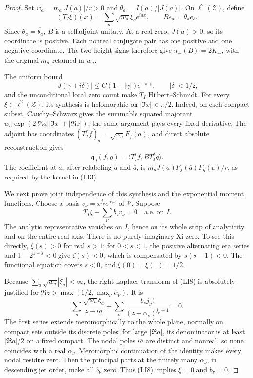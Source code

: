 \documentclass[11pt]{article}
\theoremstyle{remark}\newtheorem{remark}[theorem]{Remark}
\begin{document}
\begin{proof}
Set \(w_a=m_a|J(a)|/r>0\) and \(\theta_a=J(a)/|J(a)|\).
On \(\ell^2(\mathcal Z)\), define
\[
 (T_I\xi)(x)=\sum_a\sqrt{w_a}\xi_a e^{i\overline a x},
 \qquad B e_a=\theta_a e_{\overline a}.
 \tag{LI5}
\]
Since \(\theta_{\overline a}=\overline{\theta_a}\), \(B\) is a
selfadjoint unitary. At a real zero, \(J(a)>0\), so its coordinate
is positive. Each nonreal conjugate pair has one positive and one
negative coordinate. The two height signs therefore give
\(n_-(B)=2K_+\), with the original \(m_a\) retained in \(w_a\).

The uniform bound
\[
 |J(\gamma+i\delta)|\le C(1+|\gamma|)e^{-\pi|\gamma|},
 \qquad |\delta|<1/2,
 \tag{LI6}
\]
and the unconditional local zero count make \(T_I\)
Hilbert--Schmidt. For every \(\xi\in\ell^2(\mathcal Z)\), its
synthesis is holomorphic on \(|\Im x|<\pi/2\). Indeed, on each
compact subset, Cauchy--Schwarz gives the summable squared
majorant \(w_a\exp(2|\Re a||\Im x|+|\Re x|)\); the same argument
pays every fixed derivative. The adjoint has coordinates
\((T_I^*f)_a=\sqrt{w_a}F_f(a)\), and direct absolute reconstruction
gives
\[
 \mathfrak q_J(f,g)=\langle T_I^*f,BT_I^*g\rangle .
 \tag{LI7}
\]
The coefficient at \(a\), after relabeling \(a\) and \(\overline a\),
is \(m_aJ(a)\overline{F_f(\overline a)}F_g(a)/r\), as required by
the kernel in (LI3).

We next prove joint independence of this synthesis and the
exponential moment functions. Choose a basis
\(v_\nu=x^{j_\nu}e^{\alpha_\nu x}\) of \(\mathcal V\). Suppose
\[
 T_I\xi+\sum_\nu b_\nu v_\nu=0 \quad\text{a.e. on }I .
 \tag{LI8}
\]
The analytic representative vanishes on \(I\), hence on its whole
strip of analyticity and on the entire real axis. There is no
purely imaginary Xi zero. To see this directly, \(\xi(s)>0\) for
real \(s>1\); for \(0<s<1\), the positive alternating eta series
and \(1-2^{1-s}<0\) give \(\zeta(s)<0\), which is compensated by
\(s(s-1)<0\). The functional equation covers \(s<0\), and
\(\xi(0)=\xi(1)=1/2\).

Because \(\sum_a\sqrt{w_a}|\xi_a|<\infty\), the right Laplace
transform of (LI8) is absolutely justified for
\(\Re z>\max(1/2,\max_\nu\alpha_\nu)\). It is
\[
 \sum_a\frac{\sqrt{w_a}\xi_a}{z-i\overline a}
       +\sum_\nu\frac{b_\nu j_\nu!}
                          {(z-\alpha_\nu)^{j_\nu+1}}=0 .
 \tag{LI9}
\]
The first series extends meromorphically to the whole plane,
normally on compact sets outside its discrete poles: for large
\(|\Re a|\), its denominator is at least \(|\Re a|/2\) on a fixed
compact. The nodal poles \(i\overline a\) are distinct and
nonreal, so none coincides with a real \(\alpha_\nu\). Meromorphic
continuation of the identity makes every nodal residue zero.
Then the principal parts at the finitely many \(\alpha_\nu\),
in descending jet order, make all \(b_\nu\) zero. Thus (LI8)
implies \(\xi=0\) and \(b_\nu=0\).


\end{proof}
\end{document}
